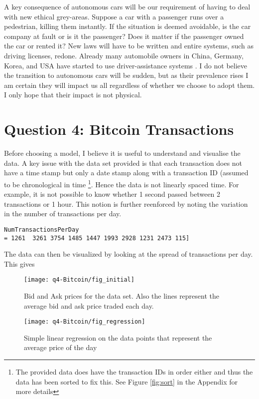 \documentclass{article}
\begin{document}
 A key consequence of autonomous cars will be our requirement of having to deal with new ethical grey-areas. Suppose a car with a passenger runs over a pedestrian, killing them instantly. If the situation is deemed avoidable, is the car company at fault or is it the passenger? Does it matter if the passenger owned the car or rented it? New laws will have to be written and entire systems, such as driving licenses, redone. Already many automobile owners in China, Germany, Korea, and USA have started to use driver-assistance systems \cite{Mckinsey}. I do not believe the transition to autonomous cars will be sudden, but as their prevalence rises I am certain they will impact us all regardless of whether we choose to adopt them. I only hope that their impact is not physical.
 
\newpage
\section{Question 4: Bitcoin Transactions}

Before choosing a model, I believe it is useful to understand and visualise the data. A key issue with the data set provided is that each transaction does not have a time stamp but only a date stamp along with a transaction ID (assumed to be chronological in time \footnote{The provided data does have the transaction IDs in order either and thus the data has been sorted to fix this. See Figure \ref{fig:sort} in the Appendix for more details}. Hence the data is not linearly spaced time. For example, it is not possible to know whether 1 second passed between 2 transactions or 1 hour. This notion is further reenforced by noting the variation in the number of transactions per day. 

\begin{lstlisting}
NumTransactionsPerDay 
= 1261  3261 3754 1485 1447 1993 2928 1231 2473 115]
\end{lstlisting}

The data can then be visualized by looking at the spread of transactions per day. This gives 

	\begin{figure}[h!]
		\centering
		\texttt{[image: q4-Bitcoin/fig\_initial]}
		\caption{Bid and Ask prices for the data set. Also the lines represent the average bid and ask price traded each day.}
	\end{figure}

\begin{figure}[h!]
		\centering
		\texttt{[image: q4-Bitcoin/fig\_regression]}
		\caption{Simple linear regression on the data points that represent the average price of the day}
\end{figure}
	
\end{document}
